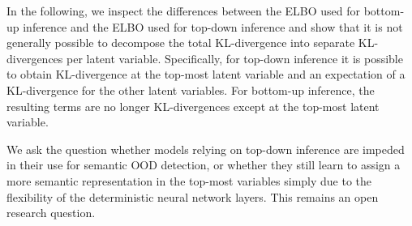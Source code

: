 {In the following, we inspect the differences between the ELBO used for bottom-up inference and the ELBO used for top-down inference and show that it is not generally possible to decompose the total KL-divergence into separate KL-divergences per latent variable.
Specifically, for top-down inference it is possible to obtain KL-divergence at the top-most latent variable and an expectation of a KL-divergence for the other latent variables.
For bottom-up inference, the resulting terms are no longer KL-divergences except at the top-most latent variable.

We ask the question whether models relying on top-down inference are impeded in their use for semantic OOD detection, or whether they still learn to assign a more semantic representation in the top-most variables simply due to the flexibility of the deterministic neural network layers.
This remains an open research question.


}
